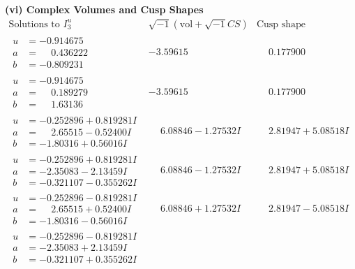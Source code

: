 \documentclass[1p]{elsarticle_modified}
\theoremstyle{definition}
\newcommand{\I}{\sqrt{-1}}
\begin{document}
\newpage\flushleft \textbf{(vi) Complex Volumes and Cusp Shapes}
$$\begin{array}{c|c|c}  
\text{Solutions to }I^u_{3}& \I (\text{vol} + \sqrt{-1}CS) & \text{Cusp shape}\\
 \hline 
\begin{aligned}
u &= -0.914675\phantom{ +0.000000I} \\
a &= \phantom{-}0.436222\phantom{ +0.000000I} \\
b &= -0.809231\phantom{ +0.000000I}\end{aligned}
 & -3.59615\phantom{ +0.000000I} & \phantom{-}0.177900\phantom{ +0.000000I} \\ \hline\begin{aligned}
u &= -0.914675\phantom{ +0.000000I} \\
a &= \phantom{-}0.189279\phantom{ +0.000000I} \\
b &= \phantom{-}1.63136\phantom{ +0.000000I}\end{aligned}
 & -3.59615\phantom{ +0.000000I} & \phantom{-}0.177900\phantom{ +0.000000I} \\ \hline\begin{aligned}
u &= -0.252896 + 0.819281 I \\
a &= \phantom{-}2.65515 - 0.52400 I \\
b &= -1.80316 + 0.56016 I\end{aligned}
 & \phantom{-}6.08846 - 1.27532 I & \phantom{-}2.81947 + 5.08518 I \\ \hline\begin{aligned}
u &= -0.252896 + 0.819281 I \\
a &= -2.35083 - 2.13459 I \\
b &= -0.321107 - 0.355262 I\end{aligned}
 & \phantom{-}6.08846 - 1.27532 I & \phantom{-}2.81947 + 5.08518 I \\ \hline\begin{aligned}
u &= -0.252896 - 0.819281 I \\
a &= \phantom{-}2.65515 + 0.52400 I \\
b &= -1.80316 - 0.56016 I\end{aligned}
 & \phantom{-}6.08846 + 1.27532 I & \phantom{-}2.81947 - 5.08518 I \\ \hline\begin{aligned}
u &= -0.252896 - 0.819281 I \\
a &= -2.35083 + 2.13459 I \\
b &= -0.321107 + 0.355262 I\end{aligned}

\end{array}$$
\end{document}
